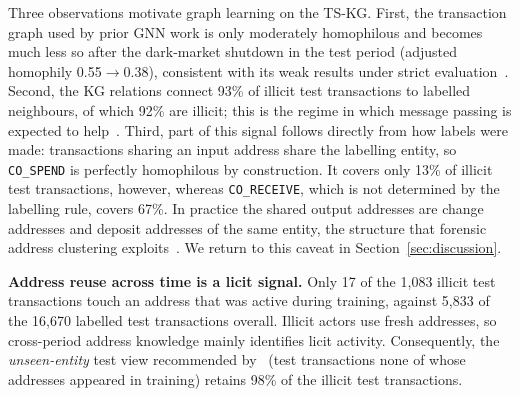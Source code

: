 \begin{table}[t]
\caption{Label homophily of transaction relations (labelled nodes).}
\label{tab:homophily}
\centering
\footnotesize
\setlength{\tabcolsep}{3.2pt}
\end{table}

Three observations motivate graph learning on the TS-KG. First, the
transaction graph used by prior GNN work is only moderately homophilous and
becomes much less so after the dark-market shutdown in the test period
(adjusted homophily 0.55$\rightarrow$0.38), consistent with its weak results
under strict evaluation~\cite{maganti2026}. Second, the KG relations connect
93\% of illicit test transactions to labelled neighbours, of which 92\% are
illicit; this is the regime in which message passing is expected to
help~\cite{zhu2020,platonov2023}. Third, part of this signal follows directly
from how labels were made: transactions sharing an input address share the
labelling entity, so \texttt{CO\_SPEND} is perfectly homophilous by
construction. It covers only 13\% of illicit test transactions, however,
whereas \texttt{CO\_RECEIVE}, which is not determined by the labelling rule,
covers 67\%. In practice the shared output addresses are change addresses and
deposit addresses of the same entity, the structure that forensic address
clustering exploits~\cite{meiklejohn2013}. We return to this caveat in
Section~\ref{sec:discussion}.

\textbf{Address reuse across time is a licit signal.} Only 17 of the 1{,}083
illicit test transactions touch an address that was active during training,
against 5{,}833 of the 16{,}670 labelled test transactions overall. Illicit
actors use fresh addresses, so cross-period address knowledge mainly
identifies licit activity. Consequently, the \emph{unseen-entity} test view
recommended by~\cite{safar2026} (test transactions none of whose addresses
appeared in training) retains 98\% of the illicit test transactions.
